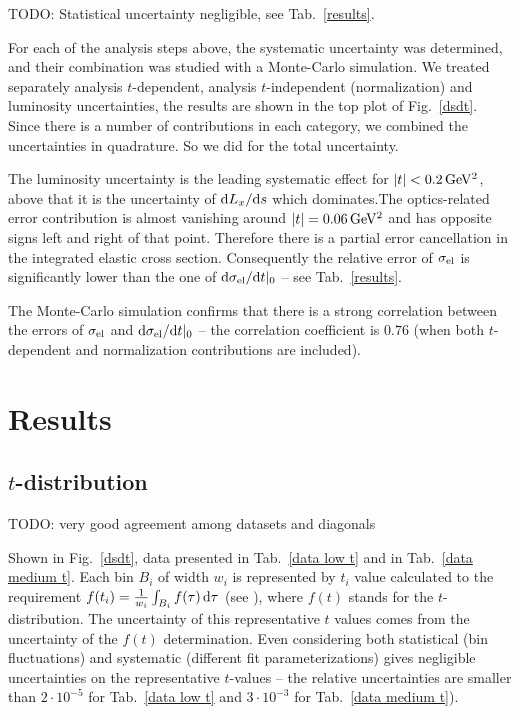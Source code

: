 \documentclass[doublecol]{../macros/epl2}
\def\d{{\rm d}}
\def\un#1{\,{\rm #1}}
\begin{document}
TODO: Statistical uncertainty negligible, see Tab.~\ref{results}.

For each of the analysis steps above, the systematic uncertainty was determined, and their combination was studied with a Monte-Carlo simulation. We treated separately analysis $t$-dependent, analysis $t$-independent (normalization) and luminosity uncertainties, the results are shown in the top plot of Fig.~\ref{dsdt}. Since there is a number of contributions in each category, we combined the uncertainties in quadrature. So we did for the total uncertainty.

The luminosity uncertainty is the leading systematic effect for $|t| < 0.2\un{GeV^2}$, above that it is the uncertainty of $\d L_x/\d s$ which dominates.The optics-related error contribution is almost vanishing around $|t| = 0.06\un{GeV^2}$ and has opposite signs left and right of that point. Therefore there is a partial error cancellation in the integrated elastic cross section. Consequently the relative error of $\sigma_{\rm el}$ is significantly lower than the one of $\d\sigma_{\rm el}/\d t|_0$ -- see Tab.~\ref{results}.

The Monte-Carlo simulation confirms that there is a strong correlation between the errors of $\sigma_{\rm el}$ and $\d\sigma_{\rm el}/\d t|_0$ -- the correlation coefficient is $0.76$ (when both $t$-dependent and normalization contributions are included).



\section{Results}

\subsection{$t$-distribution}

TODO: very good agreement among datasets and diagonals

Shown in Fig.~\ref{dsdt}, data presented in Tab.~\ref{data low t} and in Tab.~\ref{data medium t}. Each bin $B_i$ of width $w_i$ is represented by $t_i$ value calculated to the requirement $f(t_i) = {1\over w_i} \int_{B_i} f(\tau)\, \d\tau$ (see \cite{lafferty94}), where $f(t)$ stands for the $t$-distribution. The uncertainty of this representative $t$ values comes from the uncertainty of the $f(t)$ determination. Even considering both statistical (bin fluctuations) and systematic (different fit parameterizations) gives negligible uncertainties on the representative $t$-values -- the relative uncertainties are smaller than $2\cdot10^{-5}$ for Tab.~\ref{data low t} and $3\cdot10^{-3}$ for Tab.~\ref{data medium t}).
\end{document}
